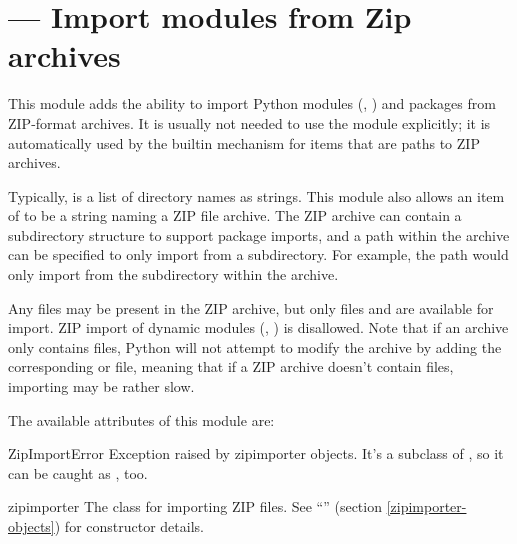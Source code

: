 \section{ ---
         Import modules from Zip archives}



This module adds the ability to import Python modules (,
) and packages from ZIP-format archives. It is usually
not needed to use the  module explicitly; it is
automatically used by the builtin  mechanism for
 items that are paths to ZIP archives.

Typically,  is a list of directory names as strings.  This
module also allows an item of  to be a string naming a ZIP
file archive. The ZIP archive can contain a subdirectory structure to
support package imports, and a path within the archive can be specified to
only import from a subdirectory.  For example, the path
 would only import from the
 subdirectory within the archive.

Any files may be present in the ZIP archive, but only files  and
 are available for import.  ZIP import of dynamic modules
(, ) is disallowed. Note that if an archive only
contains  files, Python will not attempt to modify the archive
by adding the corresponding  or  file, meaning that
if a ZIP archive doesn't contain  files, importing may be rather
slow.

The available attributes of this module are:

\begin{excdesc}{ZipImportError}
  Exception raised by zipimporter objects. It's a subclass of
  , so it can be caught as ,
  too.
\end{excdesc}

\begin{classdesc*}{zipimporter}
  The class for importing ZIP files.  See
  ``'' (section \ref{zipimporter-objects})
  for constructor details.
\end{classdesc*}


